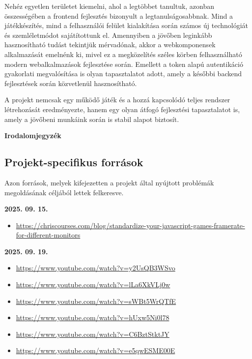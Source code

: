 \documentclass[12pt]{report}
\newcommand{\fullpagetitle}[1]{%
    \clearpage
    \thispagestyle{empty}
    \vspace*{\fill}
    \begin{center}
        {\Huge\bfseries #1\par}
    \end{center}
    \vspace*{\fill}
    \clearpage
    \setcounter{section}{0}
}
\begin{document}
Nehéz egyetlen területet kiemelni, ahol a legtöbbet tanultuk, azonban összességében a frontend fejlesztés bizonyult a legtanulságosabbnak. Mind a játékkészítés, mind a felhasználói felület kialakítása során számos új technológiát és szemléletmódot sajátítottunk el. Amennyiben a jövőben leginkább hasznosítható tudást tekintjük mérvadónak, akkor a webkomponensek alkalmazását emelnénk ki, mivel ez a megközelítés széles körben felhasználható modern webalkalmazások fejlesztése során. Emellett a token alapú autentikáció gyakorlati megvalósítása is olyan tapasztalatot adott, amely a későbbi backend fejlesztések során közvetlenül hasznosítható.

A projekt nemcsak egy működő játék és a hozzá kapcsolódó teljes rendszer létrehozását eredményezte, hanem egy olyan átfogó fejlesztési tapasztalatot is, amely a jövőbeni munkáink során is stabil alapot biztosít.

\fullpagetitle{Irodalomjegyzék}

\newpage
\markboth{}{}

\subsection*{Projekt-specifikus források}
Azon források, melyek kifejezetten a projekt által nyújtott problémák megoldásának céljából lettek felkeresve.
\bigskip

\noindent\textbf{2025. 09. 15.}
\begin{itemize}[left=0pt, topsep=0pt]
    \item \url{https://chriscourses.com/blog/standardize-your-javascript-games-framerate-for-different-monitors}
\end{itemize}

\noindent\textbf{2025. 09. 19.}
\begin{itemize}[left=0pt, topsep=0pt]
    \item \url{https://www.youtube.com/watch?v=y2UsQB3WSvo}
    \item \url{https://www.youtube.com/watch?v=lLa6XkVLj0w}
    \item \url{https://www.youtube.com/watch?v=sWBt5WrQTfE}
    \item \url{https://www.youtube.com/watch?v=hUxw5Ni0l78}
    \item \url{https://www.youtube.com/watch?v=C6BztStktJY}
    \item \url{https://www.youtube.com/watch?v=e5qwESME00E}
\end{itemize}
\end{document}
